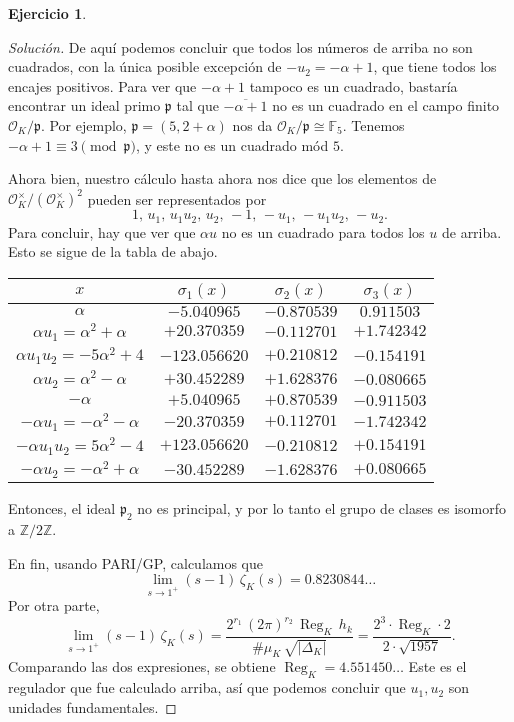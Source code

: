 \documentclass{article}
\theoremstyle{definition}
\newtheorem{ejercicio}{Ejercicio}
\newenvironment{solucion}{\begin{proof}[Solución]}{\end{proof}}
\DeclareMathOperator{\Reg}{Reg}
\newcommand{\FF}{\mathbb{F}}
\newcommand{\ZZ}{\mathbb{Z}}
\renewcommand{\O}{\mathcal{O}}
\begin{document}
\begin{ejercicio}
\begin{solucion}
    De aquí podemos concluir que todos los números de arriba no son cuadrados,
    con la única posible excepción de $-u_2 = -\alpha + 1$, que tiene todos los
    encajes positivos. Para ver que $-\alpha + 1$ tampoco es un cuadrado,
    bastaría encontrar un ideal primo $\mathfrak{p}$ tal que
    $\overline{-\alpha + 1}$ no es un cuadrado en el campo finito
    $\O_K/\mathfrak{p}$. Por ejemplo, $\mathfrak{p} = (5,2+\alpha)$ nos da
    $\O_K/\mathfrak{p} \cong \FF_5$.  Tenemos
    $-\alpha + 1 \equiv 3 \pmod{\mathfrak{p}}$, y este no es un cuadrado mód
    $5$.

    Ahora bien, nuestro cálculo hasta ahora nos dice que los elementos de
    $\O_K^\times/(\O_K^\times)^2$ pueden ser representados por
    $$1, \, u_1, \, u_1 u_2, \, u_2, \, -1, \, -u_1, \, -u_1 u_2, \, -u_2.$$
    Para concluir, hay que ver que $\alpha u$ no es un cuadrado para todos los
    $u$ de arriba. Esto se sigue de la tabla de abajo.

    \begin{center}
      \renewcommand{\arraystretch}{1.5}
      \begin{tabular}{cccc}
        \hline
        $x$ & $\sigma_1 (x)$ & $\sigma_2 (x)$ & $\sigma_3 (x)$ \\
        \hline
        $\alpha$ & $-5.040965$ & $-0.870539$ & $0.911503$ \\
        \hline
        $\alpha u_1 = \alpha^2 + \alpha$ & $+20.370359$ & $-0.112701$ & $+1.742342$ \\
        \hline
        $\alpha u_1 u_2 = -5\alpha^2 + 4$ & $-123.056620$ & $+0.210812$ & $-0.154191$ \\
        \hline
        $\alpha u_2 = \alpha^2 - \alpha$ & $+30.452289$ & $+1.628376$ & $-0.080665$ \\
        \hline
        $-\alpha$ & $+5.040965$ & $+0.870539$ & $-0.911503$ \\
        \hline
        $-\alpha u_1 = -\alpha^2 - \alpha$ & $-20.370359$ & $+0.112701$ & $-1.742342$ \\
        \hline
        $-\alpha u_1 u_2 = 5\alpha^2 - 4$ & $+123.056620$ & $-0.210812$ & $+0.154191$ \\
        \hline
        $-\alpha u_2 = -\alpha^2 + \alpha$ & $-30.452289$ & $-1.628376$ & $+0.080665$ \\
        \hline
      \end{tabular}
    \end{center}

    Entonces, el ideal $\mathfrak{p}_2$ no es principal, y por lo tanto el grupo
    de clases es isomorfo a $\ZZ/2\ZZ$.

    En fin, usando PARI/GP, calculamos que
    $$\lim_{s \to 1^+} (s-1)\,\zeta_K (s) = 0.8230844\ldots$$
    Por otra parte,
    $$\lim_{s \to 1^+} (s-1)\,\zeta_K (s) = \frac{2^{r_1}\,(2\pi)^{r_2}\,\Reg_K\,h_k}{\#\mu_K\,\sqrt{|\Delta_K|}} = \frac{2^3\cdot\Reg_K\cdot 2}{2\cdot \sqrt{1957}}.$$
    Comparando las dos expresiones, se obtiene $\Reg_K = 4.551450\ldots$ Este es
    el regulador que fue calculado arriba, así que podemos concluir que
    $u_1,u_2$ son unidades fundamentales.
  \end{solucion}
  \fi
\end{ejercicio}
\end{document}

